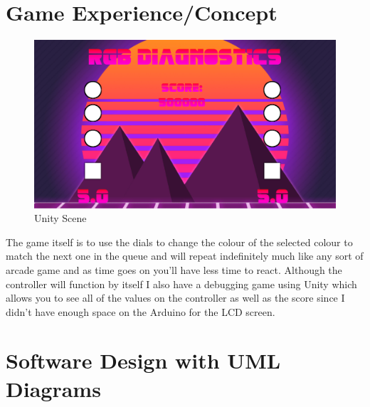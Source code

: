 \documentclass{article}
\begin{document}
\section{Game Experience/Concept}
\begin{figure}[ht]
  \includegraphics[width=\textwidth,height=\textheight,keepaspectratio]{unity-diagnostics.PNG}
  \caption{Unity Scene}
  \label{fig:unity-diagnostics}
\end{figure}

The game itself is to use the dials to change the colour of the selected colour to match the next one in the queue and will repeat indefinitely much like any sort of arcade game and as time goes on you'll have less time to react. Although the controller will function by itself I also have a debugging game using Unity which allows you to see all of the values on the controller as well as the score since I didn't have enough space on the Arduino for the LCD screen.

\section{Software Design with UML Diagrams}
\end{document}
